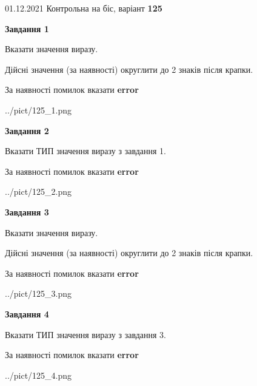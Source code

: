 \documentclass[11pt, ukrainian]{article}
\begin{document}
{01.12.2021 Контрольна на біс, варіант  \No \textbf { 125 }\par}
{
\begin {large}
{\begin {center}\textbf{Завдання 1}\end {center}}\par
Вказати значення виразу. \par
Дійсні значення (за наявності) округлити до 2 знаків після крапки. \par
За наявності помилок вказати \textbf{error}

\begin{center}
	{../pict/125_1.png}
\end{center}
\newpage

{\begin {center}\textbf{Завдання 2}\end {center}}\par
Вказати ТИП значення виразу з завдання 1. \par
За наявності помилок вказати \textbf{error}

\begin{center}
	{../pict/125_2.png}
\end{center}
\newpage

{\begin {center}\textbf{Завдання 3}\end {center}}\par
Вказати значення виразу. \par
Дійсні значення (за наявності) округлити до 2 знаків після крапки. \par
За наявності помилок вказати \textbf{error}

\begin{center}
	{../pict/125_3.png}
\end{center}
\newpage

{\begin {center}\textbf{Завдання 4}\end {center}}\par
Вказати ТИП значення виразу з завдання 3. \par
За наявності помилок вказати \textbf{error}

\begin{center}
	{../pict/125_4.png}
\end{center}
\newpage


\end{large}}
\end{document}
